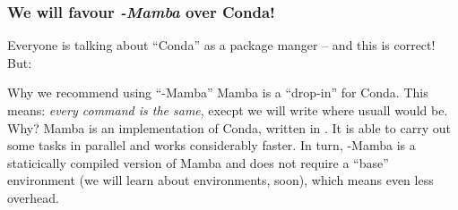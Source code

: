 \begin{frame}[fragile]
  \frametitle{We will favour \emph{\textmu-Mamba} over Conda!}
  Everyone is talking about ``Conda'' as a package manger -- and this is correct! But:
  \begin{block}{Why we recommend using ``\textmu-Mamba''}
   Mamba is a ``drop-in'' for Conda. This means: \emph{every command is the same}, execpt we will write  where usuall  would be.\newline
   Why?\newline
   Mamba is an implementation of Conda, written in \CC{}. It is able to carry out some tasks in parallel and works considerably faster. In turn, \textmu-Mamba is a staticically compiled version of Mamba and does not require a ``base'' environment (we will learn about environments, soon), which means even less overhead.
  \end{block}
\end{frame}

% 



